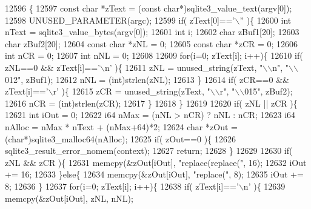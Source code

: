 \begin{DoxyCode}
12596  \{
12597   \textcolor{keyword}{const} \textcolor{keywordtype}{char} *zText = (\textcolor{keyword}{const} \textcolor{keywordtype}{char}*)sqlite3_value_text(argv[0]);
12598   UNUSED_PARAMETER(argc);
12599   \textcolor{keywordflow}{if}( zText[0]==\textcolor{charliteral}{'\(\backslash\)''} )\{
12600     \textcolor{keywordtype}{int} nText = sqlite3_value_bytes(argv[0]);
12601     \textcolor{keywordtype}{int} i;
12602     \textcolor{keywordtype}{char} zBuf1[20];
12603     \textcolor{keywordtype}{char} zBuf2[20];
12604     \textcolor{keyword}{const} \textcolor{keywordtype}{char} *zNL = 0;
12605     \textcolor{keyword}{const} \textcolor{keywordtype}{char} *zCR = 0;
12606     \textcolor{keywordtype}{int} nCR = 0;
12607     \textcolor{keywordtype}{int} nNL = 0;
12608 
12609     \textcolor{keywordflow}{for}(i=0; zText[i]; i++)\{
12610       \textcolor{keywordflow}{if}( zNL==0 && zText[i]==\textcolor{charliteral}{'\(\backslash\)n'} )\{
12611         zNL = unused_string(zText, \textcolor{stringliteral}{"\(\backslash\)\(\backslash\)n"}, \textcolor{stringliteral}{"\(\backslash\)\(\backslash\)012"}, zBuf1);
12612         nNL = (int)strlen(zNL);
12613       \}
12614       \textcolor{keywordflow}{if}( zCR==0 && zText[i]==\textcolor{charliteral}{'\(\backslash\)r'} )\{
12615         zCR = unused_string(zText, \textcolor{stringliteral}{"\(\backslash\)\(\backslash\)r"}, \textcolor{stringliteral}{"\(\backslash\)\(\backslash\)015"}, zBuf2);
12616         nCR = (int)strlen(zCR);
12617       \}
12618     \}
12619 
12620     \textcolor{keywordflow}{if}( zNL || zCR )\{
12621       \textcolor{keywordtype}{int} iOut = 0;
12622       i64 nMax = (nNL > nCR) ? nNL : nCR;
12623       i64 nAlloc = nMax * nText + (nMax+64)*2;
12624       \textcolor{keywordtype}{char} *zOut = (\textcolor{keywordtype}{char}*)sqlite3_malloc64(nAlloc);
12625       \textcolor{keywordflow}{if}( zOut==0 )\{
12626         sqlite3_result_error_nomem(context);
12627         \textcolor{keywordflow}{return};
12628       \}
12629 
12630       \textcolor{keywordflow}{if}( zNL && zCR )\{
12631         memcpy(&zOut[iOut], \textcolor{stringliteral}{"replace(replace("}, 16);
12632         iOut += 16;
12633       \}\textcolor{keywordflow}{else}\{
12634         memcpy(&zOut[iOut], \textcolor{stringliteral}{"replace("}, 8);
12635         iOut += 8;
12636       \}
12637       \textcolor{keywordflow}{for}(i=0; zText[i]; i++)\{
12638         \textcolor{keywordflow}{if}( zText[i]==\textcolor{charliteral}{'\(\backslash\)n'} )\{
12639           memcpy(&zOut[iOut], zNL, nNL);

\end{DoxyCode}
